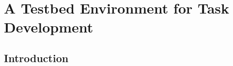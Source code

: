 
\chapter{A Testbed Environment for Task Development }\label{c1}


\section{Introduction}










